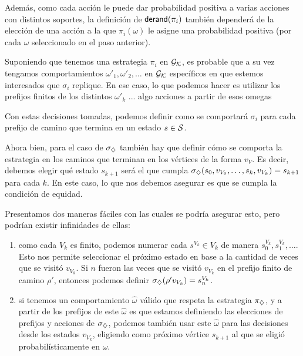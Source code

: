 Además, como cada acción le puede dar probabilidad positiva a varias acciones
con distintos soportes, la definición de $\textsf{derand}(\pi_i)$ también dependerá de
la elección de una acción a la que $\pi_i(\omega)$ le asigne una probabilidad
positiva (por cada $\omega$ seleccionado en el paso anterior).

\begin{boxgris}{}
	Suponiendo que tenemos una estrategia $\pi_i$ en $\mathcal{G}_{\mathcal{K}}$, es probable que a su vez tengamos comportamientos $\omega'_1, \omega'_2, \dots$ en $\mathcal{G}_{\mathcal{K}}$ específicos en que estemos interesados que $\sigma_i$ replique. En ese caso, lo que podemos hacer es utilizar los prefijos finitos de los distintos $\omega'_k$ ... algo acciones a partir de esos omegas
\end{boxgris}

Con estas decisiones tomadas, podemos definir como se comportará $\sigma_i$
para cada prefijo de camino que termina en un estado $s \in \mathcal{S}$.

Ahora bien, para el caso de $\sigma_\diamondsuit$ también hay que definir cómo se
comporta la estrategia en los caminos que terminan en los vértices de la forma
$v_V$. Es decir, debemos elegir qué estado $s_{k+1}$ será el que cumpla
$\sigma_\diamondsuit(s_0, v_{V_0}, \dots, s_k, v_{V_k}) = s_{k+1}$ para cada $k$. En
este caso, lo que nos debemos asegurar es que se cumpla la condición de
equidad.

\begin{boxgris}{}
	Presentamos dos maneras fáciles con las cuales se podría asegurar esto, pero
	podrían existir infinidades de ellas:
	\begin{enumerate}
		\item como cada $V_k$ es finito, podemos numerar cada $s^{V_k} \in V_k$ de manera
		      $s_0^{V_k}, s_1^{V_k}, \dots$. Esto nos permite seleccionar el próximo estado
		      en base a la cantidad de veces que se visitó $v_{V_k}$. Si $n$ fueron las veces
		      que se visitó $v_{V_k}$ en el prefijo finito de camino $\rho '$, entonces
		      podemos definir $\sigma_\diamondsuit(\rho ' v_{V_k}) = s_n^{V_k}$.
		\item si tenemos un comportamiento $\hat \omega$ válido que respeta la estrategia
		      $\pi_\diamondsuit$, y a partir de los prefijos de este $\hat \omega$ es que estamos
		      definiendo las elecciones de prefijos y acciones de $\sigma_\diamondsuit$, podemos
		      también usar este $\hat \omega$ para las decisiones desde los estados
		      $v_{V_k}$, eligiendo como próximo vértice $s_{k+1}$ al que se eligió
		      probabilísticamente en $\hat \omega$.
	\end{enumerate}
\end{boxgris}

